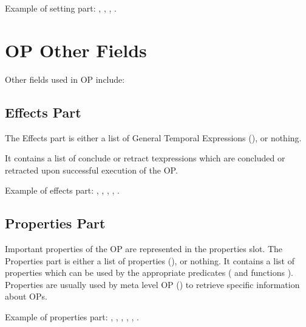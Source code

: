 Example of setting part: \*
, \*
, \*
, \*
.

\section{OP Other Fields}

Other fields used in OP include:


\subsection{Effects Part}

The Effects part is either a list of General Temporal Expressions
(), or nothing.

It contains a list of conclude or retract texpressions which are
concluded or retracted upon successful execution of the OP.

Example of effects part: \*
\code{()}, \*
, \*
, \*
, \*
.

\subsection{Properties Part}

Important properties of the OP are represented in the properties slot. The
Properties part is either a list of properties (), or
nothing. It contains a list of properties which can be used by the appropriate
predicates ( and functions
). Properties are usually used
by meta level OP () to retrieve specific information about OPs.

Example of properties part: \*
\code{()}, \*
, \*
, \*
, \*
, \*
.

